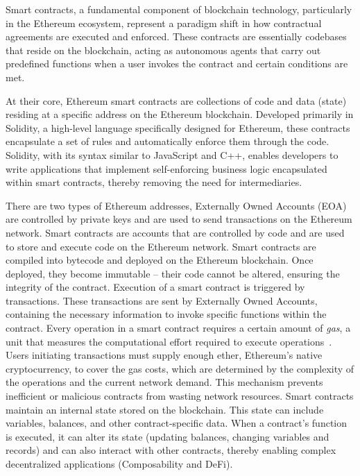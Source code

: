 Smart contracts, a fundamental component of blockchain technology, particularly in the Ethereum ecosystem, represent a paradigm shift in how contractual agreements are executed and enforced. These contracts are essentially codebases that reside on the blockchain, acting as autonomous agents that carry out predefined functions when a user invokes the contract and certain conditions are met. 

At their core, Ethereum smart contracts are collections of code and data (state) residing at a specific address on the Ethereum blockchain. Developed primarily in Solidity, a high-level language specifically designed for Ethereum, these contracts encapsulate a set of rules and automatically enforce them through the code. Solidity, with its syntax similar to JavaScript and C++, enables developers to write applications that implement self-enforcing business logic encapsulated within smart contracts, thereby removing the need for intermediaries.

There are two types of Ethereum addresses, Externally Owned Accounts (EOA) are controlled by private keys and are used to send transactions on the Ethereum network. Smart contracts are accounts that are controlled by code and are used to store and execute code on the Ethereum network. Smart contracts are compiled into bytecode and deployed on the Ethereum blockchain. Once deployed, they become immutable – their code cannot be altered, ensuring the integrity of the contract. Execution of a smart contract is triggered by transactions. These transactions are sent by Externally Owned Accounts, containing the necessary information to invoke specific functions within the contract. Every operation in a smart contract requires a certain amount of \textit{gas}, a unit that measures the computational effort required to execute operations~\cite{gasethereumorg}. Users initiating transactions must supply enough ether, Ethereum's native cryptocurrency, to cover the gas costs, which are determined by the complexity of the operations and the current network demand. This mechanism prevents inefficient or malicious contracts from wasting network resources. Smart contracts maintain an internal state stored on the blockchain. This state can include variables, balances, and other contract-specific data. When a contract's function is executed, it can alter its state (\eg updating balances, changing variables and records) and can also interact with other contracts, thereby enabling complex decentralized applications (Composability and DeFi).

